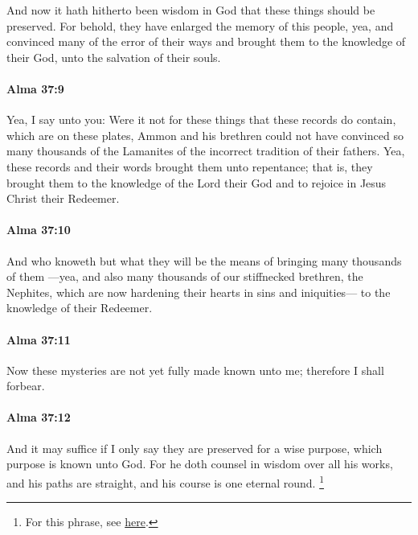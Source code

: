 			And now it hath hitherto been wisdom in God
			that these things should be preserved.
			For behold, they have enlarged the memory of this people,
			yea, and convinced many of the error of their ways
			and brought them to the knowledge of their God,
			unto the salvation of their souls.

		\paragraph{Alma 37:9} %
			\label{ALMA-37-9}

			Yea, I say unto you:
			Were it not for these things that these records do contain, which are on these plates,
			Ammon and his brethren could not have convinced
			so many thousands of the Lamanites of the incorrect tradition of their fathers.
			Yea, these records and their words brought them unto repentance;
			that is, they brought them to the knowledge of the Lord their God
			and to rejoice in Jesus Christ their Redeemer.

		\paragraph{Alma 37:10} %
			\label{ALMA-37-10}

			And who knoweth but what they will be the means
			of bringing many thousands of them
			---yea, and also many thousands of our stiffnecked brethren, the Nephites,
			which are now hardening their hearts in sins and iniquities---
			to the knowledge of their Redeemer.

		\paragraph{Alma 37:11} %
			\label{ALMA-37-11}

			Now these mysteries are not yet fully made known unto me;
			therefore I shall forbear.

		\paragraph{Alma 37:12} %
			\label{ALMA-37-12}

			And it may suffice if I only say
			they are preserved for a wise purpose,
			which purpose is known unto God.
			For he doth counsel in wisdom over all his works,
			and his paths are straight,
			and his course is one eternal round.%
				\footnote{%
					For this phrase, see \hyperref[ROUND-PHRASES]{here}.
					}

